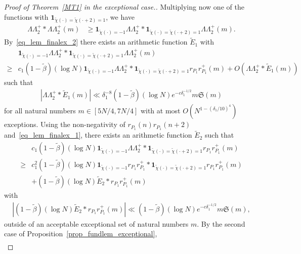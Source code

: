 \documentclass[12pt]{amsart}
\theoremstyle{definition}
\theoremstyle{remark}
\numberwithin{equation}{section}
\newcommand{\1}{\mathbf{1}}
\begin{document}
\begin{proof}[Proof of Theorem~\ref{MT1} in the exceptional case.]
				Multiplying now one of the functions with $\1_{\widetilde{\chi}(\cdot)=\widetilde{\chi}(\cdot+2)=1}$, we have
				\begin{align*}
					\Lambda \Lambda_2^+*\Lambda \Lambda_2^+(m)&\geq \1_{\widetilde{\chi}(\cdot)=-1}\Lambda \Lambda_2^+*\1_{\widetilde{\chi}(\cdot)=\widetilde{\chi}(\cdot+2)=1}\Lambda \Lambda_2^+(m).
				\end{align*}
				By~\eqref{eq_lem_finalex_2} there exists an arithmetic function $\widetilde{E}_1$ with
				\begin{align*}
					&\1_{\widetilde{\chi}(\cdot)=-1}\Lambda \Lambda_2^+*\1_{\widetilde{\chi}(\cdot)=\widetilde{\chi}(\cdot+2)=1}\Lambda \Lambda_2^+(m)\\
					\geq& c_1 (1-\widetilde{\beta})(\log N)\1_{\widetilde{\chi}(\cdot)=-1}\Lambda \Lambda_2^+*\1_{\widetilde{\chi}(\cdot)=\widetilde{\chi}(\cdot+2)=1}r_{P_1}r_{P_1}^+(m)+O(\Lambda \Lambda_2^+*\widetilde{E}_1(m))
				\end{align*}
				such that
				\begin{align*}
					|\Lambda \Lambda_2^+*\widetilde{E}_1(m)|\ll \delta_1^{-8} (1-\widetilde{\beta})(\log N) e^{-c \delta_1^{-1/2}} m\mathfrak{S}(m)
				\end{align*}
				for all natural numbers $m\in [5N/4,7N/4]$ with at most $O(N^{1-(\delta_1/10)^4})$ exceptions. 
				Using the non-negativity of $r_{P_1}(n)r_{P_1}(n+2)$ and~\eqref{eq_lem_finalex_1}, there exists an arithmetic function $\widetilde{E}_2$ such that
				\begin{align*}
					&c_1 (1-\widetilde{\beta})(\log N)\1_{\widetilde{\chi}(\cdot)=-1}\Lambda \Lambda_2^+*\1_{\widetilde{\chi}(\cdot)=\widetilde{\chi}(\cdot+2)=1}r_{P_1}r_{P_1}^+(m)\\
					\geq& c_1^2 (1-\widetilde{\beta})(\log N) \1_{\widetilde{\chi}(\cdot)=-1}r_{P_1} r^+_{P_1}* \1_{\widetilde{\chi}(\cdot)=\widetilde{\chi}(\cdot+2)=1}r_{P_1} r^+_{P_1}(m)\\
					&+(1-\widetilde{\beta})(\log N)\widetilde{E}_2* r_{P_1} r^+_{P_1}(m)
				\end{align*}
				 with
				\begin{align*}
					|(1-\widetilde{\beta})(\log N)\widetilde{E}_2* r_{P_1} r^+_{P_1}(m)|\ll (1-\widetilde{\beta})(\log N) e^{-c \delta_1^{-1/2}} m\mathfrak{S}(m),
				\end{align*}
				outside of an acceptable exceptional set of natural numbers $m$. By the second case of Proposition~\ref{prop_fundlem_exceptional},
				\begin{align*}

\end{align*}
\end{proof}
\end{document}
